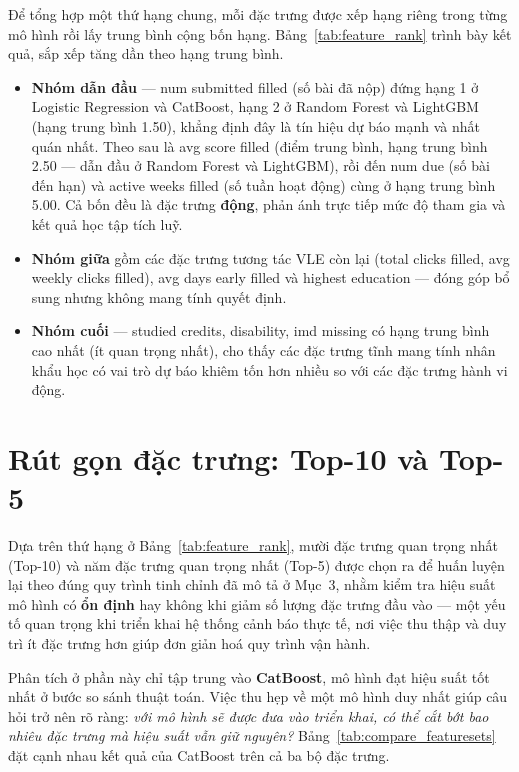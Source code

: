 \documentclass[a4paper]{article}
\newcommand{\code}[1]{{\ttfamily\def\_{\textunderscore\discretionary{}{}{}}#1}}
\def\code#1{#1}%
\def\_{ }%
\begin{document}
Để tổng hợp một thứ hạng chung, mỗi đặc trưng được xếp hạng riêng trong từng
mô hình rồi lấy trung bình cộng bốn hạng. Bảng~\ref{tab:feature_rank} trình bày
kết quả, sắp xếp tăng dần theo hạng trung bình.



\begin{itemize}[leftmargin=*]
  \item \textbf{Nhóm dẫn đầu} --- \code{num\_submitted\_filled} (số bài đã
        nộp) đứng hạng 1 ở Logistic Regression và CatBoost, hạng 2 ở Random
        Forest và LightGBM (hạng trung bình 1.50), khẳng định đây là tín hiệu
        dự báo mạnh và nhất quán nhất. Theo sau là \code{avg\_score\_filled}
        (điểm trung bình, hạng trung bình 2.50 --- dẫn đầu ở Random Forest và
        LightGBM), rồi đến \code{num\_due} (số bài đến hạn) và
        \code{active\_weeks\_filled} (số tuần hoạt động) cùng ở hạng trung
        bình 5.00. Cả bốn đều là đặc trưng \textbf{động}, phản ánh trực tiếp
        mức độ tham gia và kết quả học tập tích luỹ.
  \item \textbf{Nhóm giữa} gồm các đặc trưng tương tác VLE còn lại
        (\code{total\_clicks\_filled}, \code{avg\_weekly\_clicks\_filled}),
        \code{avg\_days\_early\_filled} và \code{highest\_education} --- đóng
        góp bổ sung nhưng không mang tính quyết định.
  \item \textbf{Nhóm cuối} --- \code{studied\_credits}, \code{disability},
        \code{imd\_missing} có hạng trung bình cao nhất (ít quan trọng nhất),
        cho thấy các đặc trưng tĩnh mang tính nhân khẩu học có vai trò dự báo
        khiêm tốn hơn nhiều so với các đặc trưng hành vi động.
\end{itemize}

\section{Rút gọn đặc trưng: Top-10 và Top-5}

Dựa trên thứ hạng ở Bảng~\ref{tab:feature_rank}, mười đặc trưng quan trọng
nhất (Top-10) và năm đặc trưng quan trọng nhất (Top-5) được chọn ra để huấn
luyện lại theo đúng quy trình tinh chỉnh đã mô tả ở Mục~3, nhằm kiểm tra hiệu
suất mô hình có \textbf{ổn định} hay không khi giảm số lượng đặc trưng đầu
vào --- một yếu tố quan trọng khi triển khai hệ thống cảnh báo thực tế, nơi
việc thu thập và duy trì ít đặc trưng hơn giúp đơn giản hoá quy trình vận hành.

Phân tích ở phần này chỉ tập trung vào \textbf{CatBoost}, mô hình đạt hiệu suất
tốt nhất ở bước so sánh thuật toán. Việc thu hẹp về một mô hình duy nhất giúp
câu hỏi trở nên rõ ràng: \textit{với mô hình sẽ được đưa vào triển khai, có thể
cắt bớt bao nhiêu đặc trưng mà hiệu suất vẫn giữ nguyên?}
Bảng~\ref{tab:compare_featuresets} đặt cạnh nhau kết quả của CatBoost trên cả
ba bộ đặc trưng.
\end{document}
